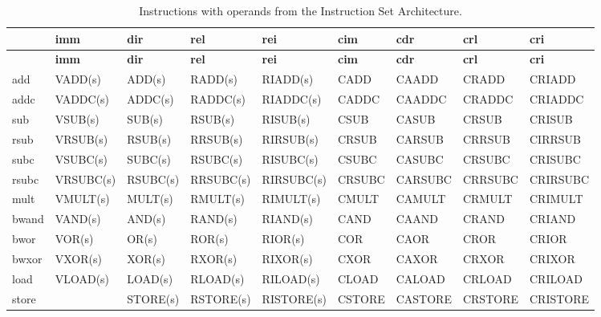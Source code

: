 {\scriptsize
{\centering
\begin{longtable}{|p{7mm}|p{16.5mm}|p{12mm}|l|l|l|l|l|l|}
\caption{Instructions with operands from the Instruction Set Architecture.}
\label{table:isa_instructions} \\
\hline
 & \textbf{imm} & \textbf{dir} & \textbf{rel} & \textbf{rei} & \textbf{cim} & \textbf{cdr} & \textbf{crl} & \textbf{cri} \\
\hline
\endfirsthead
\hline
 & \textbf{imm} & \textbf{dir} & \textbf{rel} & \textbf{rei} & \textbf{cim} & \textbf{cdr} & \textbf{crl} & \textbf{cri} \\
\hline
\endhead
\hline
\endfoot
\hline
\endlastfoot
add       & VADD(s)    & ADD(s)    & RADD(s)    & RIADD(s)    & CADD    & CAADD    & CRADD    & CRIADD    \\ \hline
addc      & VADDC(s)   & ADDC(s)   & RADDC(s)   & RIADDC(s)   & CADDC   & CAADDC   & CRADDC   & CRIADDC   \\ \hline
sub       & VSUB(s)    & SUB(s)    & RSUB(s)    & RISUB(s)    & CSUB    & CASUB    & CRSUB    & CRISUB    \\ \hline
rsub      & VRSUB(s)   & RSUB(s)   & RRSUB(s)   & RIRSUB(s)   & CRSUB   & CARSUB   & CRRSUB   & CIRRSUB   \\ \hline
subc      & VSUBC(s)   & SUBC(s)   & RSUBC(s)   & RISUBC(s)   & CSUBC   & CASUBC   & CRSUBC   & CRISUBC   \\ \hline
rsubc     & VRSUBC(s)  & RSUBC(s)  & RRSUBC(s)  & RIRSUBC(s)  & CRSUBC  & CARSUBC  & CRRSUBC  & CRIRSUBC  \\ \hline
mult      & VMULT(s)   & MULT(s)   & RMULT(s)   & RIMULT(s)   & CMULT   & CAMULT   & CRMULT   & CRIMULT   \\ \hline
bwand     & VAND(s)    & AND(s)    & RAND(s)    & RIAND(s)    & CAND    & CAAND    & CRAND    & CRIAND    \\ \hline
bwor      & VOR(s)     & OR(s)     & ROR(s)     & RIOR(s)     & COR     & CAOR     & CROR     & CRIOR     \\ \hline
bwxor     & VXOR(s)    & XOR(s)    & RXOR(s)    & RIXOR(s)    & CXOR    & CAXOR    & CRXOR    & CRIXOR    \\ \hline
load      & VLOAD(s)   & LOAD(s)   & RLOAD(s)   & RILOAD(s)   & CLOAD   & CALOAD   & CRLOAD   & CRILOAD   \\ \hline
store     &            & STORE(s)  & RSTORE(s)  & RISTORE(s)  & CSTORE  & CASTORE  & CRSTORE  & CRISTORE  \\ \hline

\end{longtable}}}
